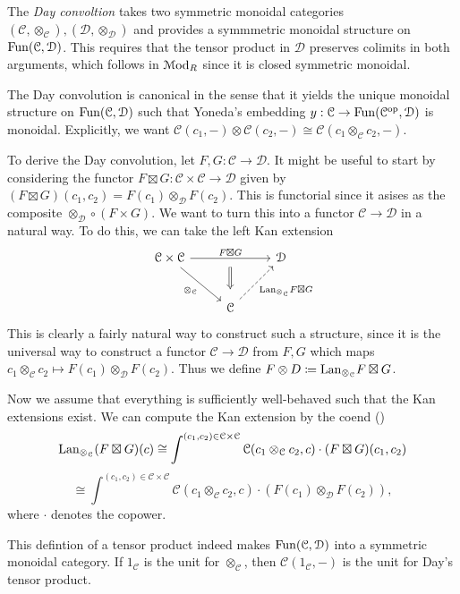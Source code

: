 \begin{construction}\label{1.1.6}
	The \emph{Day convoltion} takes two symmetric monoidal categories $(\mathcal{C},\otimes _\mathcal{C}) ,(\mathcal{D} ,\otimes _\mathcal{D} )$ and provides a symmmetric monoidal structure on $\operatorname{Fun}(\mathcal{C} ,\mathcal{D} )$. This requires that the tensor product in $\mathcal{D} $ preserves colimits in both arguments, which follows in $\mathcal{M}\mathrm{od} _R$ since it is closed symmetric monoidal.

	The Day convolution is canonical in the sense that it yields the unique monoidal structure on $\operatorname{Fun}(\mathcal{C} ,\mathcal{D} )$ such that Yoneda's embedding $y : \mathcal{C} \to \operatorname{Fun}(\mathcal{C}^{\mathrm{op}} ,\mathcal{D} )$ is monoidal. Explicitly, we want $\mathcal{C} (c_1,-)\otimes \mathcal{C} (c_2,-)\cong \mathcal{C}(c_1\otimes _\mathcal{C} c_2,-)$.

	To derive the Day convolution, let $F,G : \mathcal{C}  \to \mathcal{D} $. It might be useful to start by considering the functor $F\boxtimes G : \mathcal{C} \times \mathcal{C}  \to \mathcal{D} $ given by $(F\boxtimes G)(c_1,c_2)=F(c_1)\otimes _\mathcal{D} F(c_2)$. This is functorial since it asises as the composite $\otimes _\mathcal{D} \circ (F\times G)$. We want to turn this into a functor $\mathcal{C} \to \mathcal{D} $ in a natural way. To do this, we can take the left Kan extension
	\[\begin{tikzcd}[row sep = 2.5em, column sep = 2.5em]
		\mathcal{C} \times \mathcal{C} \ar[" F\boxtimes G "{name=owo}, rr] \ar[" \otimes_\mathcal{C}   "', dr]  &  & \mathcal{D}  \\
	 & \mathcal{C} \ar[" \Lan_{\otimes _\mathcal{C} } F\boxtimes G "', dashed, ur]  & 
	 \arrow[from=owo, to=2-2, Rightarrow, shorten=7pt]
	\end{tikzcd}\]
	This is clearly a fairly natural way to construct such a structure, since it is the universal way to construct a functor $\mathcal{C} \to \mathcal{D} $ from $F,G$ which maps $c_1\otimes_\mathcal{C} c_2 \mapsto F(c_1)\otimes _\mathcal{D} F(c_2)$. Thus we define $F\otimes D \coloneqq \mathrm{Lan}_{\otimes _\mathcal{C} } F\boxtimes G$.

	Now we assume that everything is sufficiently well-behaved such that the Kan extensions exist. We can compute the Kan extension by the coend (\cite{ml})
	\[
		\mathrm{Lan}_{\otimes _\mathcal{C} } (F\boxtimes G)(c) \cong \int^{(c_1,c_2)\in \mathcal{C}\times \mathcal{C}  } \mathcal{C} (c_1\otimes_\mathcal{C}  c_2,c)\cdot (F\boxtimes G)(c_1, c_2)
	\]
	\[
		\cong \int^{(c_1,c_2)\in \mathcal{C} \times \mathcal{C} } \mathcal{C} (c_1\otimes_\mathcal{C}  c_2,c)\cdot (F(c_1)\otimes_\mathcal{D}  F(c_2))
	,\]
	where $\cdot $ denotes the copower.

	This defintion of a tensor product indeed makes $\operatorname{Fun}(\mathcal{C} ,\mathcal{D} )$ into a symmetric monoidal category. If $1_\mathcal{C} $ is the unit for $\otimes _\mathcal{C} $, then $\mathcal{C} (1_\mathcal{C} ,-)$ is the unit for Day's tensor product.
\end{construction}

